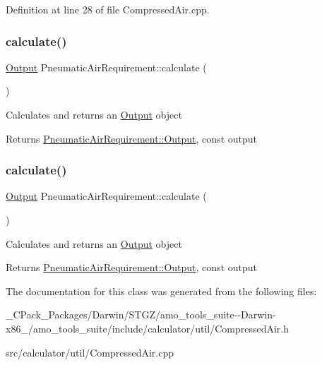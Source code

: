 Definition at line 28 of file Compressed\+Air.\+cpp.

\mbox{\label{class_pneumatic_air_requirement_ad49d3ecb061cc5a40aa2dc08432be04d}} 
\subsubsection{\texorpdfstring{calculate()}{calculate()}\hspace{0.1cm}{\footnotesize\ttfamily [2/3]}}
{\footnotesize\ttfamily \hyperlink{class_pneumatic_air_requirement_1_1_output}{Output} Pneumatic\+Air\+Requirement\+::calculate (\begin{DoxyParamCaption}{ }\end{DoxyParamCaption})}

Calculates and returns an \hyperlink{class_pneumatic_air_requirement_1_1_output}{Output} object \begin{DoxyReturn}{Returns}
\hyperlink{class_pneumatic_air_requirement_1_1_output}{Pneumatic\+Air\+Requirement\+::\+Output}, const output 
\end{DoxyReturn}
\mbox{\label{class_pneumatic_air_requirement_ad49d3ecb061cc5a40aa2dc08432be04d}} 
\subsubsection{\texorpdfstring{calculate()}{calculate()}\hspace{0.1cm}{\footnotesize\ttfamily [3/3]}}
{\footnotesize\ttfamily \hyperlink{class_pneumatic_air_requirement_1_1_output}{Output} Pneumatic\+Air\+Requirement\+::calculate (\begin{DoxyParamCaption}{ }\end{DoxyParamCaption})}

Calculates and returns an \hyperlink{class_pneumatic_air_requirement_1_1_output}{Output} object \begin{DoxyReturn}{Returns}
\hyperlink{class_pneumatic_air_requirement_1_1_output}{Pneumatic\+Air\+Requirement\+::\+Output}, const output 
\end{DoxyReturn}


The documentation for this class was generated from the following files\+:\begin{DoxyCompactItemize}
\item 
\+\_\+\+C\+Pack\+\_\+\+Packages/\+Darwin/\+S\+T\+G\+Z/amo\+\_\+tools\+\_\+suite-\/-\/\+Darwin-\/x86\+\_/amo\+\_\+tools\+\_\+suite/include/calculator/util/Compressed\+Air.\+h\item 
src/calculator/util/Compressed\+Air.\+cpp\end{DoxyCompactItemize}
